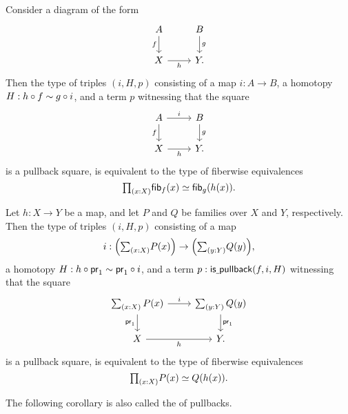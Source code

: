 \begin{prp}\label{thm:pb_fibequiv_complete}
Consider a diagram of the form
\begin{equation*}
\begin{tikzcd}
A \arrow[d,swap,"f"] & B \arrow[d,"g"] \\
X \arrow[r,swap,"h"] & Y.
\end{tikzcd}
\end{equation*}
Then the type of triples $(i,H,p)$ consisting of a map $i:A\to B$, a homotopy $H:h\circ f\sim g\circ i$, and a term $p$ witnessing that the square
\begin{equation*}
\begin{tikzcd}
A \arrow[d,swap,"f"] \arrow[r,"i"] & B \arrow[d,"g"] \\
X \arrow[r,swap,"h"] & Y.
\end{tikzcd}
\end{equation*}
is a pullback square, is equivalent to the type of fiberwise equivalences
\begin{equation*}
\prd{x:X}\eqv{\fib{f}{x}}{\fib{g}{h(x)}}.
\end{equation*}
\end{prp}

\begin{cor}\label{cor:pb_fibequiv_complete}
Let $h:X\to Y$ be a map, and let $P$ and $Q$ be families over $X$ and $Y$, respectively.
Then the type of triples $(i,H,p)$ consisting of a map 
\begin{equation*}
i:\Big(\sm{x:X}P(x)\Big)\to \Big(\sm{y:Y}Q(y)\Big),
\end{equation*}
a homotopy $H:h\circ \mathsf{pr}_{1}\sim \mathsf{pr}_{1}\circ i$, and a term $p:\mathsf{is\underline{\ }{}pullback}(f,i,H)$ witnessing that the square
\begin{equation*}
\begin{tikzcd}
\sm{x:X}P(x) \arrow[d,swap,"\proj 1"] \arrow[r,"i"] & \sm{y:Y}Q(y) \arrow[d,"\proj 1"] \\
X \arrow[r,swap,"h"] & Y.
\end{tikzcd}
\end{equation*}
is a pullback square, is equivalent to the type of fiberwise equivalences
\begin{equation*}
\prd{x:X}\eqv{P(x)}{Q(h(x))}.
\end{equation*}
\end{cor}

The following corollary is also called the  of pullbacks.

